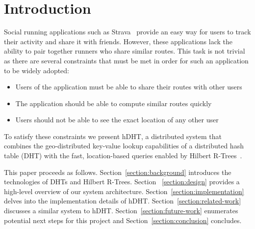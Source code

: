 \section{Introduction}
Social running applications such as Strava~\cite{strava} provide an easy way for users to track their activity and share it with friends. However, these applications lack the ability to pair together runners who share similar routes. This task is not trivial as there are several constraints that must be met in order for such an application to be widely adopted:
\begin{itemize}
	\item Users of the application must be able to share their routes with other users
	\item The application should be able to compute similar routes quickly
	\item Users should not be able to see the exact location of any other user
\end{itemize}

To satisfy these constraints we present hDHT, a distributed system that combines the geo-distributed key-value lookup capabilities of a distributed hash table (DHT) with the fast, location-based queries enabled by Hilbert R-Trees~\cite{kamel1993hilbert}.


This paper proceeds as follows. Section~\ref{section:background} introduces the technologies of DHTs and Hilbert R-Trees. Section ~\ref{section:design} provides a high-level overview of our system architecture. Section~\ref{section:implementation} delves into the implementation details of hDHT. Section~\ref{section:related-work} discusses a similar system to hDHT. Section~\ref{section:future-work} enumerates potential next steps for this project and Section~\ref{section:conclusion} concludes.
